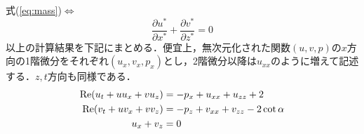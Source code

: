 \documentclass[autodetect-engine,dvipdfmx-if-dvi,ja=standard,a4paper,11pt]{bxjsarticle} %
\begin{document}
式(\ref{eq:mass})$\Leftrightarrow$
\begin{equation*}
\frac{\partial u^*}{\partial x^*}+\frac{\partial v^*}{\partial z^*}=0
\end{equation*}
以上の計算結果を下記にまとめる．便宜上，無次元化された関数$(u,v,p)$の$x$方向の1階微分をそれぞれ$(u_x,v_x,p_x)$とし，2階微分以降は$u_{xx}$のように増えて記述する．$z,t$方向も同様である．
\begin{subequations}
\begin{align}
{\rm Re}(u_t+uu_x+vu_z)&=-p_x+u_{xx}+u_{zz}+2\label{eq:gns1}\\
{\rm Re}(v_t+uv_x+vv_z)&=-p_z+v_{xx}+v_{zz}-2\cot\alpha\label{eq:gns2}\\
u_x+v_z&=0\label{eq:gmass}
\end{align}
\label{eq:gns}
\end{subequations}
\end{document}
